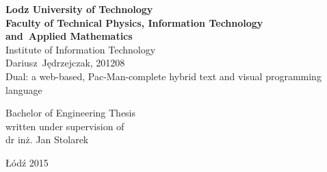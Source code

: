 \begin{titlepage}
\begin{center}
\textbf{{\large Lodz University of Technology}\\}
\vspace{\medskipamount}
\textbf{\large Faculty of Technical Physics, Information Technology\\and~Applied Mathematics}
\vspace{\medskipamount}\\
{\large Institute of Information Technology}\\\right 
\vspace{2.5cm}
{\Large {Dariusz~Jędrzejczak, 201208\\}}
\vspace{2cm}
{\huge{ {Dual: a web-based, Pac-Man-complete hybrid text and visual programming language}}}
\end{center}
\vspace{3cm}
\hfill
\begin{minipage}{.55\columnwidth}
{Bachelor of Engineering} Thesis\\
written under supervision of\\
dr inż. Jan Stolarek
\end{minipage}
\vfill
\begin{center}
Łódź {2015}
\end{center}
\end{titlepage}
